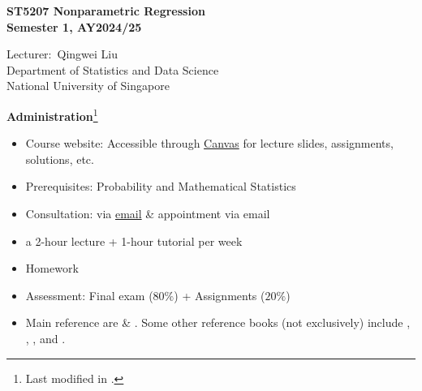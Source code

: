 \documentclass[19pt,landscaoe]{article}
\begin{document}
%

\begin{titlepage}
\begin{center}
    \vfill
\textbf{\huge ST5207 Nonparametric Regression\\
Semester 1, AY2024/25}\\[4cm]
\begin{minipage}{0.4\textwidth}
\begin{center} \large
Lecturer:~Qingwei Liu\\
\vskip 6pt
Department of Statistics and Data Science\\
\vskip 6pt
National University of Singapore
\end{center}
\end{minipage}%
\vfill
\vfill
\end{center}

\end{titlepage}
%
\newpage
{\LARGE\centerline{\textbf {Administration}\footnote{Last modified in .}}}
\vskip25pt
\begin{minipage}{.9\textwidth}
    \Large
\begin{itemize}
\item Course website: Accessible through \href{https://www.nus.edu.sg/canvas/login/}{Canvas} for lecture slides, assignments, solutions, etc. 
\item Prerequisites: Probability and Mathematical Statistics 
\item Consultation: via \href{mailto:liu_qw@nus.edu.sg}{ email} \& appointment via email
\item a 2-hour lecture + 1-hour tutorial per week
\item Homework
\item Assessment: Final exam ($80\%$) + Assignments ($20\%$)
\item Main reference are \cite{hardle04} \& \cite{scott15}. Some other reference books (not exclusively) include \cite{simonoff12}, \cite{takezawa05}, \cite{Hall13}, and \cite{kloke14}.

\end{itemize}
\end{minipage}
\newpage
\end{document}
